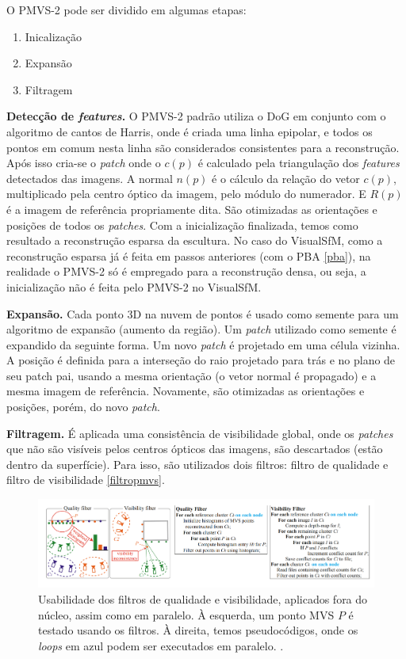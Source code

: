 O PMVS-2 pode ser dividido em algumas etapas:
\begin{enumerate}
\item{Inicalização}
\item{Expansão}
\item{Filtragem}
\end{enumerate}

\noindent\textbf{Detecção de \emph{features}.}
O PMVS-2 padrão utiliza o DoG em conjunto com o algoritmo de cantos de Harris, onde é criada uma linha epipolar, e todos os pontos em comum nesta linha são considerados consistentes para a reconstrução. 
Após isso cria-se o \emph{patch} onde o $c(p)$ é calculado pela triangulação dos \emph{features} detectados das imagens. A normal $n(p)$ é o cálculo da relação do vetor $c(p)$, multiplicado pela centro óptico da imagem, pelo módulo do numerador. E $R(p)$ é a imagem de referência propriamente dita. São otimizadas as orientações e posições de todos os \emph{patches}.
Com a inicialização finalizada, temos como resultado a reconstrução esparsa da escultura. No caso do VisualSfM, como a reconstrução esparsa já é feita em passos anteriores (com o PBA \ref{pba}), na realidade o PMVS-2 só é empregado para a reconstrução densa, ou seja, a inicialização não é feita pelo PMVS-2 no VisualSfM.

\noindent\textbf{Expansão.}
Cada ponto 3D na nuvem de pontos é usado como semente para um algoritmo de expansão (aumento da região). Um \emph{patch} utilizado como semente é expandido da seguinte forma. Um novo \emph{patch} é projetado em uma célula vizinha.
A posição é definida para a interseção do raio projetado para trás e no plano de seu patch pai, usando a mesma orientação (o vetor normal é propagado) e a mesma imagem de referência.
Novamente, são otimizadas as orientações e posições, porém, do novo \emph{patch}.	

\noindent\textbf{Filtragem.}
É aplicada uma consistência de visibilidade global, onde os \emph{patches} que
não são visíveis pelos centros ópticos das imagens, são descartados (estão
dentro da superfície). Para isso, são utilizados dois filtros: filtro de
qualidade e filtro de visibilidade \ref{filtropmvs}.

\begin{figure}[!h]
	\centering
	\includegraphics[width=1\linewidth]{figs/filtropmvs.png}
	\caption{%
  Usabilidade dos filtros de qualidade e visibilidade, aplicados fora
  do núcleo, assim como em paralelo. À esquerda, um ponto MVS $P$ é testado
  usando os filtros. À direita, temos pseudocódigos, onde os \emph{loops}
  em azul podem ser executados em paralelo.
	\protect\cite{furukawa2010towards}.
	}\label{fig:filtropmvs}
\end{figure} 

